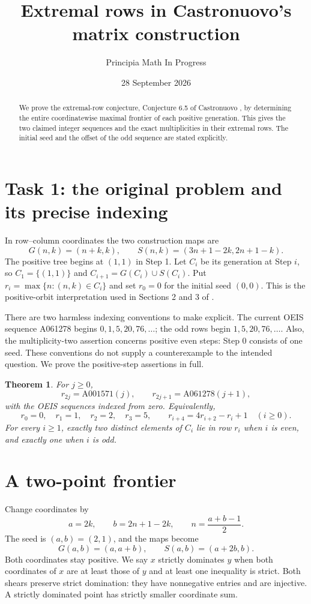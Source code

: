\documentclass[11pt]{article}
\title{Extremal rows in Castronuovo's matrix construction}
\author{Principia Math In Progress}
\date{28 September 2026}
\newtheorem{theorem}{Theorem}
\begin{document}
\maketitle
\begin{abstract}
We prove the extremal-row conjecture, Conjecture 6.5 of Castronuovo
\cite{C}, by determining the entire coordinatewise maximal frontier
of each positive generation. This gives the two claimed integer
sequences and the exact multiplicities in their extremal rows.
The initial seed and the offset of the odd sequence are stated explicitly.
\end{abstract}

\section*{Task 1: the original problem and its precise indexing}
In row--column coordinates the two construction maps are
\[
 G(n,k)=(n+k,k),\qquad S(n,k)=(3n+1-2k,2n+1-k).
\]
The positive tree begins at $(1,1)$ in Step 1. Let $C_i$ be its
generation at Step $i$, so $C_1=\{(1,1)\}$ and
$C_{i+1}=G(C_i)\cup S(C_i)$. Put
$r_i=\max\{n:(n,k)\in C_i\}$ and set $r_0=0$ for the initial
seed $(0,0)$. This is the positive-orbit interpretation used in
Sections 2 and 3 of \cite{C}.

There are two harmless indexing conventions to make explicit.
The current OEIS sequence A061278 begins $0,1,5,20,76,\ldots$;
the odd rows begin $1,5,20,76,\ldots$. Also, the multiplicity-two
assertion concerns positive even steps: Step 0 consists of one seed.
These conventions do not supply a counterexample to the intended
question. We prove the positive-step assertions in full.

\begin{theorem}\label{thm:main}
For $j\geq0$,
\[
 r_{2j}=\mathrm{A001571}(j),\qquad
 r_{2j+1}=\mathrm{A061278}(j+1),
\]
with the OEIS sequences indexed from zero. Equivalently,
\[
 r_0=0,\quad r_1=1,\quad r_2=2,\quad r_3=5,\qquad
 r_{i+4}=4r_{i+2}-r_i+1\quad(i\geq0).
\]
For every $i\geq1$, exactly two distinct elements of $C_i$ lie in
row $r_i$ when $i$ is even, and exactly one when $i$ is odd.
\end{theorem}

\section*{A two-point frontier}
Change coordinates by
\[
 a=2k,\qquad b=2n+1-2k,\qquad n=\frac{a+b-1}{2}.
\]
The seed is $(a,b)=(2,1)$, and the maps become
\[
 G(a,b)=(a,a+b),\qquad S(a,b)=(a+2b,b).
\]
Both coordinates stay positive. We say $x$ strictly dominates $y$
when both coordinates of $x$ are at least those of $y$ and at least
one inequality is strict. Both shears preserve strict domination:
they have nonnegative entries and are injective. A strictly
dominated point has strictly smaller coordinate sum.
\end{document}
